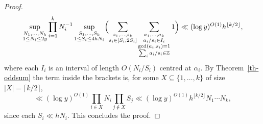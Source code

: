 \documentclass[11pt,letterpaper]{amsart}
\newcommand{\abs}[1]{\left\lvert #1\right\rvert}
\newcommand{\ogcd}[2]{\gcd(#1,#2)}
\theoremstyle{definition}
\begin{document}
\begin{proof}
\[ \sup_{\substack{N_1,\ldots,N_k\\ 1\leq N_i\leq 2y}}\prod_{i=1}^kN_i^{-1}\sup_{\substack{S_1,\ldots,S_k\\ 1\leq S_i\leq 4hN_i}} \Bigl(\sum_{\substack{s_1, \dots, s_k \\s_i\in [S_i,2S_i]}}\sum_{\substack{a_1, \dots, a_k \\ a_i/s_i \in I_i \\ \ogcd{a_i}{s_i} = 1 \\ \sum_i a_i/s_i \in \mathbb Z}}1\Bigr)\ll (\log y)^{O(1)}h^{\lfloor k/2\rfloor},\]
where each $I_i$ is an interval of length $O(N_i/S_i)$ centred at $\alpha_i$. By Theorem~\ref{th-oddsum} the term inside the brackets is, for some $X\subseteq \{1,\ldots,k\}$ of size $\abs{X}=\lceil k/2\rceil$, 
\[\ll (\log y)^{O(1)}\prod_{i\in X}N_i\prod_{j\not\in X}S_j\ll (\log y)^{O(1)}h^{\lfloor k/2\rfloor} N_1\cdots N_k,\]
since each $S_i\ll hN_i$. This concludes the proof.
\end{proof}
\end{document}
